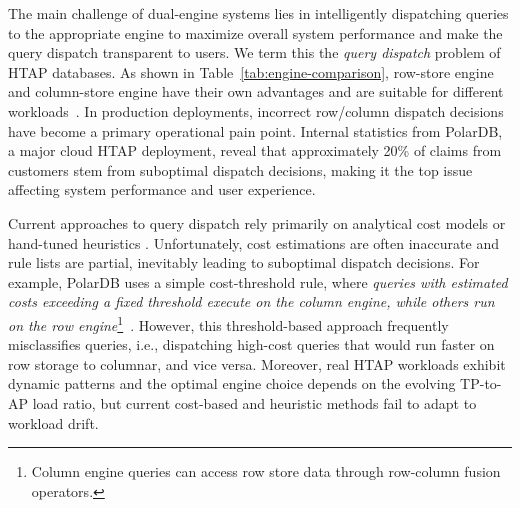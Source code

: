 \documentclass[sigconf, nonacm]{acmart}
\newcommand{\dispatcher}{AQD\xspace}
\begin{document}

The main challenge of dual-engine systems lies in intelligently dispatching queries to the appropriate engine to maximize overall system performance and make the query dispatch transparent to users. We term this the \emph{query dispatch} problem of HTAP databases. As shown in Table~\ref{tab:engine-comparison}, row-store engine and column-store engine have their own advantages and are suitable for different workloads~\cite{schmidt2024two,abadi2008column}.
In production deployments, incorrect row/column dispatch decisions have become a primary operational pain point. Internal statistics from PolarDB, a major cloud HTAP deployment, reveal that approximately 20\% of claims from customers stem from suboptimal dispatch decisions, making it the top issue affecting system performance and user experience. 

Current approaches to query dispatch rely primarily on analytical cost models \cite{wang2023polardb,chen2022bytehtap,larson2015real} or hand-tuned heuristics \cite{farber2012sap_acm}.
Unfortunately, cost estimations are often inaccurate and rule lists are partial, inevitably leading to suboptimal dispatch decisions. For example, PolarDB uses a simple cost-threshold rule, where {\it queries with estimated costs exceeding a fixed threshold execute on the column engine, while others run on the row engine}\footnote{Column engine queries can access row store data through row-column fusion operators.}~\cite{alibaba2023rowcolfusion}. However, this threshold-based approach frequently misclassifies queries, i.e., dispatching high-cost queries that would run faster on row storage to columnar, and vice versa. Moreover, real HTAP workloads exhibit dynamic patterns and the optimal engine choice depends on the evolving TP-to-AP load ratio, but current cost-based and heuristic methods fail to adapt to workload drift.
\end{document}
